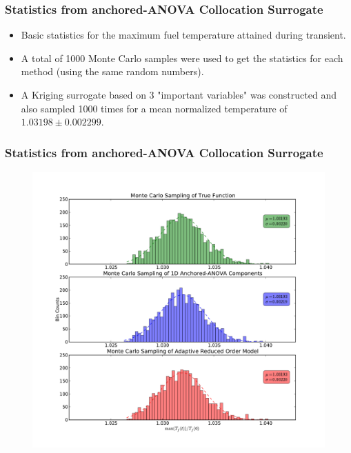 \documentclass{beamer}
\begin{document}
\begin{frame}
\frametitle{Statistics from anchored-ANOVA Collocation Surrogate}

\begin{itemize}
  \item Basic statistics for the maximum fuel temperature attained during transient.
  \item A total of 1000 Monte Carlo samples were used to get the statistics for each method (using the same random numbers). 
  \item A Kriging surrogate based on 3 "important variables" was constructed and also sampled 1000 times for a mean normalized temperature of $1.03198 \pm 0.002299$. 
\end{itemize}

\begin{table}[h] 
\centering
{}
\end{table}

\end{frame}
\begin{frame}
\frametitle{Statistics from anchored-ANOVA Collocation Surrogate}

\begin{figure}
  \includegraphics[width=.63\textwidth]{./pk_histograms.pdf}
\end{figure}

\end{frame}
\end{document}
